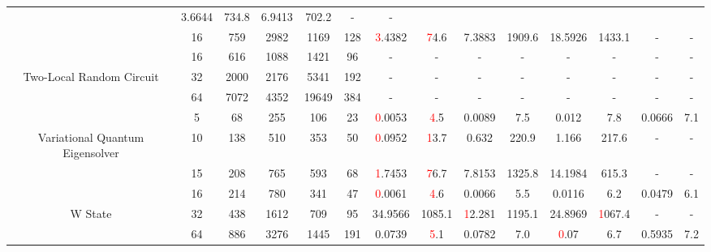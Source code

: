 \begin{table}[htb]
{\begin{tabular}{|c|c|c|c|c|c|c|c|c|c|c|c|c|c|}
 & 3.6644 & 734.8
 & 6.9413 & 702.2
 & - & -
 \\
 & 
16 & 759 & 2982 & 1169 & 128
 & \textcolor{red}3.4382 & \textcolor{red}74.6
 & 7.3883 & 1909.6
 & 18.5926 & 1433.1
 & - & -
 \\
\hline
 & 
16 & 616 & 1088 & 1421 & 96
 & - & -
 & - & -
 & - & -
 & - & -
 \\
Two-Local Random Circuit & 
32 & 2000 & 2176 & 5341 & 192
 & - & -
 & - & -
 & - & -
 & - & -
 \\
 & 
64 & 7072 & 4352 & 19649 & 384
 & - & -
 & - & -
 & - & -
 & - & -
 \\
\hline
 & 
5 & 68 & 255 & 106 & 23
 & \textcolor{red}0.0053 & \textcolor{red}4.5
 & 0.0089 & 7.5
 & 0.012 & 7.8
 & 0.0666 & 7.1
 \\
Variational Quantum Eigensolver & 
10 & 138 & 510 & 353 & 50
 & \textcolor{red}0.0952 & \textcolor{red}13.7
 & 0.632 & 220.9
 & 1.166 & 217.6
 & - & -
 \\
 & 
15 & 208 & 765 & 593 & 68
 & \textcolor{red}1.7453 & \textcolor{red}76.7
 & 7.8153 & 1325.8
 & 14.1984 & 615.3
 & - & -
 \\
\hline
 & 
16 & 214 & 780 & 341 & 47
 & \textcolor{red}0.0061 & \textcolor{red}4.6
 & 0.0066 & 5.5
 & 0.0116 & 6.2
 & 0.0479 & 6.1
 \\
W State & 
32 & 438 & 1612 & 709 & 95
 & 34.9566 & 1085.1
 & \textcolor{red}12.281 & 1195.1
 & 24.8969 & \textcolor{red}1067.4
 & - & -
 \\
 & 
64 & 886 & 3276 & 1445 & 191
 & 0.0739 & \textcolor{red}5.1
 & 0.0782 & 7.0
 & \textcolor{red}0.07 & 6.7
 & 0.5935 & 7.2
 \\
\hline
\end{tabular}}
\end{table}